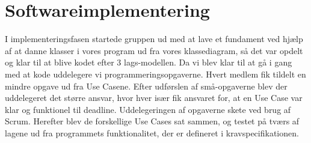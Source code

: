 \section{Softwareimplementering}
I implementeringsfasen startede gruppen ud med at lave et fundament ved hjælp af at danne klasser i vores program ud fra vores klassediagram, så det var opdelt og klar til at blive kodet efter 3 lags-modellen. Da vi blev klar til at gå i gang med at kode uddelegere vi programmeringsopgaverne. Hvert medlem fik tildelt en mindre opgave ud fra Use Casene. Efter udførslen af små-opgaverne blev der uddelegeret det større ansvar, hvor hver især fik ansvaret for, at en Use Case var klar og funktionel til deadline. Uddelegeringen af opgaverne skete ved brug af Scrum. Herefter blev de forskellige Use Cases sat sammen, og testet på tværs af lagene ud fra programmets funktionalitet, der er defineret i kravspecifikationen. 


